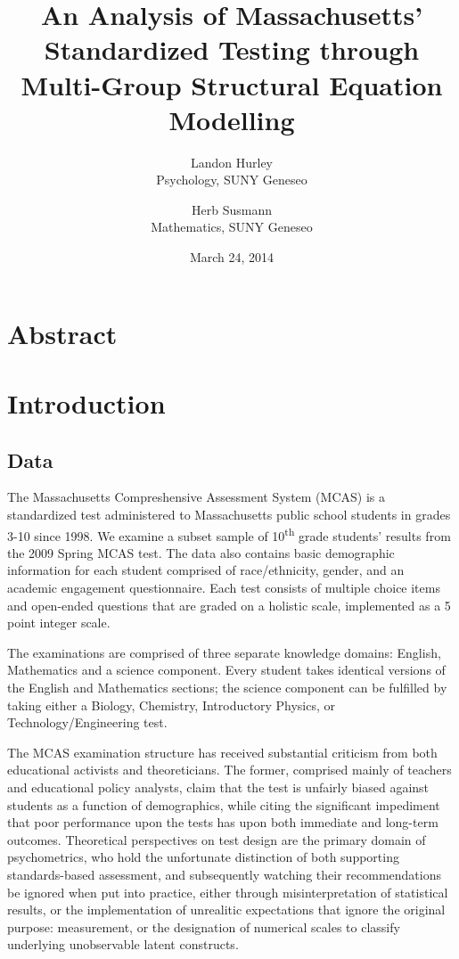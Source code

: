 \documentclass{article}\usepackage[]{graphicx}\usepackage[]{color}
\begin{document}
\title{An Analysis of Massachusetts' Standardized Testing through Multi-Group Structural Equation Modelling}
\date{March 24, 2014}
\author{Landon Hurley\\ Psychology, SUNY Geneseo \and Herb Susmann\\ Mathematics, SUNY Geneseo}

\maketitle

\section{Abstract}

\section{Introduction}

\subsection{Data}

The Massachusetts Compreshensive Assessment System (MCAS) is a standardized test administered to Massachusetts public school students in grades 3-10 since 1998. We examine a subset sample of 10\textsuperscript{th} grade students' results from the 2009 Spring MCAS test. The data also contains basic demographic information for each student comprised of race/ethnicity, gender, and an academic engagement questionnaire. Each test consists of multiple choice items and open-ended questions that are graded on a holistic scale, implemented as a 5 point integer scale. 

The examinations are comprised of three separate knowledge domains: English, Mathematics and a science component. Every student takes identical versions of the English and Mathematics sections; the science component can be fulfilled by taking either a Biology, Chemistry, Introductory Physics, or Technology/Engineering test. \cite{mcas_summary}

The MCAS examination structure has received substantial criticism from both educational activists and theoreticians. The former, comprised mainly of teachers and educational policy analysts, claim that the test is unfairly biased against students as a function of demographics, while citing the significant impediment that poor performance upon the tests has upon both immediate and long-term outcomes. Theoretical perspectives on test design are the primary domain of psychometrics, who hold the unfortunate distinction of both supporting standards-based assessment, and subsequently watching their recommendations be ignored when put into practice, either through misinterpretation of statistical results, or the implementation of unrealitic expectations that ignore the original purpose: measurement, or the designation of numerical scales to classify underlying unobservable latent constructs. 
\end{document}
